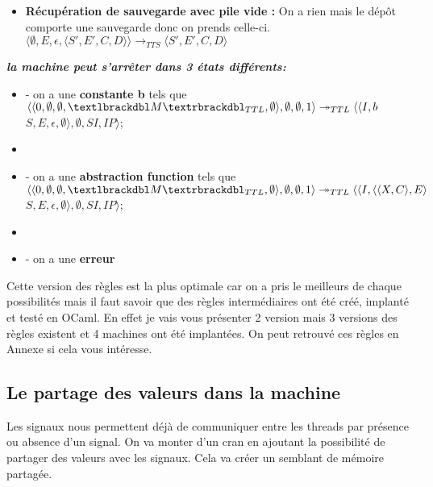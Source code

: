 \documentclass[10pt,a4paper]{article}
\begin{document}
\begin{enumerate}
\begin{itemize}
				        \item[] \textbf{Récupération de sauvegarde avec pile vide :}  On a rien mais le dépôt comporte une sauvegarde donc on prends celle-ci.
						\smallbreak  
						$\langle \emptyset,E,\epsilon,\langle S',E',C,D\rangle\rangle
						\longrightarrow_{TTS} 
						\langle S',E',C,D\rangle$
					\end{itemize}
				\end{enumerate}
				\bigbreak
				\bigbreak
					
					
				\textbf{\textit{la machine peut s'arrêter dans 3 états différents:}}
				\smallbreak
				\begin{itemize}
					\item[] - on a une \textbf{constante b} tels que 
					$\langle\langle 0,\emptyset,\emptyset,\textlbrackdbl M\textrbrackdbl_{TTL},\emptyset\rangle,\emptyset,\emptyset,1\rangle 
					\twoheadrightarrow_{TTL} 
					\langle\langle I,b$ $S,E,\epsilon,\emptyset\rangle,\emptyset,SI,IP\rangle$;
					\item[] 
				    
				    \item[] - on a une \textbf{abstraction function} tels que
					$\langle\langle 0,\emptyset,\emptyset,\textlbrackdbl M\textrbrackdbl_{TTL},\emptyset\rangle,\emptyset,\emptyset,1\rangle 
					\twoheadrightarrow_{TTL} 
					\langle\langle I,\langle\langle X,C\rangle,E\rangle$ $S,E,\epsilon,\emptyset\rangle,\emptyset,SI,IP\rangle$;
					\item[] 
			
					\item[] - on a une \textbf{erreur} 
				\end{itemize}
				\bigbreak
				\bigbreak
					
					
					
					
				Cette version des règles est la plus optimale car on a pris le meilleurs de chaque possibilités mais il faut savoir que des règles intermédiaires ont été créé, implanté et testé en OCaml. En effet je vais vous présenter 2 version mais 3 versions des règles existent et 4 machines ont été implantées. On peut retrouvé ces règles en Annexe si cela vous intéresse.
				\newpage
					
					
		\subsection{Le partage des valeurs dans la machine}
			
			Les signaux nous permettent déjà de communiquer entre les threads par présence ou absence d'un signal. On va monter d'un cran en ajoutant la possibilité de partager des valeurs avec les signaux. Cela va créer un semblant de mémoire partagée.
			\medbreak
			
\end{document}
